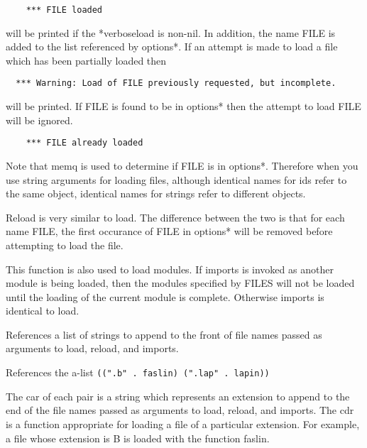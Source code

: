 \begin{verbatim}
    *** FILE loaded
\end{verbatim}
    will  be  printed  if  the  *verboseload  is  non-nil.    In
    addition,  the  name FILE is added to the list referenced by
    options*.  If an attempt is made to load a  file  which  has
    been partially loaded then

\begin{verbatim}
  *** Warning: Load of FILE previously requested, but incomplete.
\end{verbatim}
    will be printed.  If FILE is found to be  in  options*  then
    the attempt to load FILE will be ignored.

\begin{verbatim}
    *** FILE already loaded
\end{verbatim}
    Note  that memq is used to determine if FILE is in options*.
    Therefore when you use string arguments for  loading  files,
    although  identical  names for ids refer to the same object,
    identical names for strings refer to different objects.


{    Reload is very similar to load. The difference  between  the
    two  is that for each name FILE, the first occurance of FILE
    in options* will be removed before attempting  to  load  the
    file.
}

{    This  function  is also used to load modules.  If imports is
    invoked as another module is being loaded, then the  modules
    specified  by  FILES will not be loaded until the loading of
    the current  module  is  complete.    Otherwise  imports  is
    identical to load.
}

{ References  a list of strings to append to the front of
file names passed as arguments to load, reload, and imports. }

{
   References the a-list {\tt ((".b" . faslin) (".lap" . lapin)) }    
				
The car of  each  pair  is  a  string  which  represents  an
extension  to  append to the end of the file names passed as
arguments to load, reload,  and  imports.    The  cdr  is  a
function  appropriate  for  loading  a  file of a particular
extension.  For example, a file  whose  extension  is  B  is
loaded with the function faslin.  }

